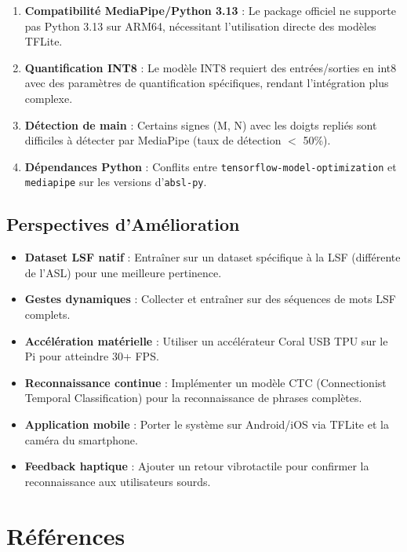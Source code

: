 \begin{enumerate}
    \item \textbf{Compatibilité MediaPipe/Python 3.13} : Le package officiel ne supporte pas Python 3.13 sur ARM64, nécessitant l'utilisation directe des modèles TFLite.
    \item \textbf{Quantification INT8} : Le modèle INT8 requiert des entrées/sorties en int8 avec des paramètres de quantification spécifiques, rendant l'intégration plus complexe.
    \item \textbf{Détection de main} : Certains signes (M, N) avec les doigts repliés sont difficiles à détecter par MediaPipe (taux de détection $<$ 50\%).
    \item \textbf{Dépendances Python} : Conflits entre \texttt{tensorflow-model-optimization} et \texttt{mediapipe} sur les versions d'\texttt{absl-py}.
\end{enumerate}

\section{Perspectives d'Amélioration}

\begin{itemize}
    \item \textbf{Dataset LSF natif} : Entraîner sur un dataset spécifique à la LSF (différente de l'ASL) pour une meilleure pertinence.
    \item \textbf{Gestes dynamiques} : Collecter et entraîner sur des séquences de mots LSF complets.
    \item \textbf{Accélération matérielle} : Utiliser un accélérateur Coral USB TPU sur le Pi pour atteindre 30+ FPS.
    \item \textbf{Reconnaissance continue} : Implémenter un modèle CTC (Connectionist Temporal Classification) pour la reconnaissance de phrases complètes.
    \item \textbf{Application mobile} : Porter le système sur Android/iOS via TFLite et la caméra du smartphone.
    \item \textbf{Feedback haptique} : Ajouter un retour vibrotactile pour confirmer la reconnaissance aux utilisateurs sourds.
\end{itemize}

\chapter*{Références}

